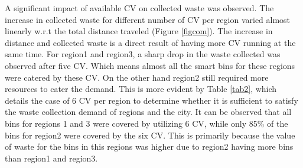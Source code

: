 \documentclass[12pt]{article}
\begin{document}
A significant impact of available CV on collected waste was observed. The increase in collected waste for different number of CV per region varied almost linearly w.r.t the total distance traveled (Figure \ref{figcom}). The increase in distance and collected waste is a direct result of having more CV running at the same time. For region1 and region3, a sharp drop in the waste collected was observed after five CV. Which means almost all the smart bins for these regions were catered by these CV. On the other hand region2 still required more resources to cater the demand. This is more evident by Table \ref{tab2}, which details the case of 6 CV per region to determine whether it is sufficient to satisfy the waste collection demand of regions and the city. It can be observed that all bins for regions 1 and 3 were covered by utilizing 6 CV, while only 85\% of the bins for region2 were covered by the six CV. This is primarily because the value of waste for the bins in this regions was higher due to region2 having more bins than region1 and region3.


\end{document}
